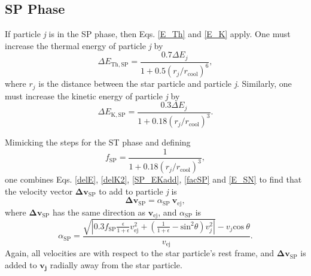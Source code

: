 \documentclass[iop]{emulateapj}
\begin{document}
\subsection{SP Phase}
If particle \textit{j} is in the SP phase, then Eqs. \ref{E_Th} and \ref{E_K} apply. One must increase the thermal energy of particle \textit{j} by
\begin{equation}\label{SP_Ethadd}
\Delta E_{\mathrm{Th,SP}} = \frac{0.7 \Delta E_j}{1 + 0.5(r_j / r_{\mathrm{cool}})^6},
\end{equation}
where $r_j$ is the distance between the star particle and particle \textit{j}. Similarly, one must increase the kinetic energy of particle \textit{j} by
\begin{equation}\label{SP_EKadd}
\Delta E_{\mathrm{K,SP}} = \frac{0.3 \Delta E_j}{1 + 0.18(r_j / r_{\mathrm{cool}})^3}.
\end{equation}

Mimicking the steps for the ST phase and defining
\begin{equation}\label{facSP}
f_{\mathrm{SP}} = \frac{1}{1 + 0.18(r_j / r_{\mathrm{cool}})^3},
\end{equation}
one combines Eqs. \ref{delE}, \ref{delK2}, \ref{SP_EKadd}, \ref{facSP} and \ref{E_SN} to find that the velocity vector $\boldsymbol{\Delta v_{\mathrm{SP}}}$ to add to particle \textit{j} is
\begin{equation}\label{SP_vadd}
\boldsymbol{\Delta v_{\mathrm{SP}}} = \alpha_{\mathrm{SP}}\ \boldsymbol{v_{\mathrm{ej}}},
\end{equation}
where $\boldsymbol{\Delta v_{\mathrm{SP}}}$ has the same direction as $\boldsymbol{v_{\mathrm{ej}}}$, and $\alpha_{\mathrm{SP}}$ is
\begin{equation}\label{alpha_sp}
\alpha_{\mathrm{SP}} = \frac{\sqrt{|0.3f_{\mathrm{SP}}\frac{\epsilon}{1+\epsilon}v_{\mathrm{ej}}^2 + (\frac{1}{1+\epsilon}-\mathrm{sin}^2\theta)v_j^2|} - v_j\mathrm{cos}\ \theta}{v_{\mathrm{ej}}}.
\end{equation}
Again, all velocities are with respect to the star particle's rest frame, and $\boldsymbol{\Delta v_{\mathrm{SP}}}$ is added to $\boldsymbol{v_j}$ radially away from the star particle.
\end{document}
